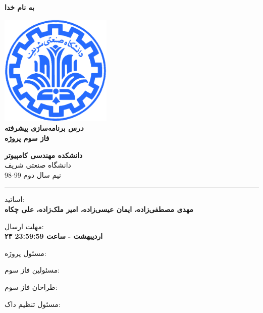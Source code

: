 \documentclass[]{article}
\begin{document}
\begin{titlepage}
\begin{center}

\textbf{ \Huge{به نام خدا} }
        
\vspace{0.2cm}

\includegraphics[width=0.4\textwidth]{sharif1.png}\\
\vspace{0.2cm}
\textbf{ \Huge{\emph درس برنامه‌سازی پیشرفته} }\\
\vspace{0.25cm}
\textbf{ \Large{ فاز سوم پروژه} }
\vspace{0.2cm}
       
 
      \large \textbf{دانشکده مهندسی کامپیوتر}\\\vspace{0.1cm}
    \large   دانشگاه صنعتی شریف\\\vspace{0.2cm}
       \large   ﻧﯿﻢ سال دوم 99-98 \\\vspace{0.10cm}
      \noindent\rule[1ex]{\linewidth}{1pt}
اساتید:\\
    \textbf{{مهدی مصطفی‌زاده، ایمان عیسی‌زاده، امیر ملک‌زاده، علی چکاه}}



    \vspace{0.20cm}

   مهلت ارسال:\\
    \textbf{{۲۳ اردیبهشت - }}
    \textbf{{ساعت 23:59:59}}

    \vspace{0.10cm}
مسئول پروژه:\\
    \textbf{}
    
        \vspace{0.10cm}
مسئولین فاز سوم:\\
    \textbf{}
    
        \vspace{0.10cm}
طراحان فاز سوم:\\
    \textbf{}
    
        \vspace{0.05cm}
مسئول تنظیم داک:\\
    \textbf{}
    

\end{center}
\end{titlepage}
\end{document}

